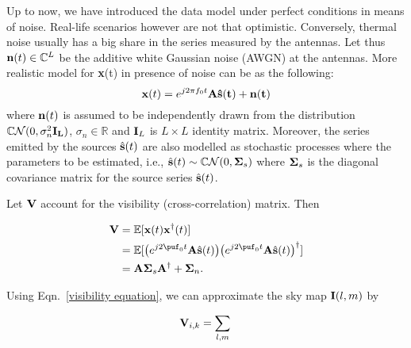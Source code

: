 \documentclass[11pt]{article}
\begin{document}
 Up to now, we have introduced the data model under perfect conditions in means of noise. Real-life scenarios however are not that optimistic. Conversely, thermal noise usually has a big share in the series measured by the antennas. Let thus ${\bf n}(t) \in \mathbb{C}^L$ be the additive white Gaussian noise (AWGN) at the antennas. More realistic model for {\bf x}(t) in presence of noise can be as the following:
 \begin{equation}
 {\bf x}(t) = e^{j2\pi f_0 t}\bf{A} \hat{\bf{s}}(t) + {\bf n}(t)\label{x_t}
 \end{equation}
where ${\bf n}(t)$ is assumed to be independently drawn from the distribution $\mathbb{C} \mathcal{N}(0,\sigma_n^2 \bf{I}_L)$, $\sigma_n \in \mathbb{R}$ and ${\bf I}_L$ is $L\times L$ identity matrix. Moreover, the series emitted by the sources $\hat{{\bf s}}(t)$ are also modelled as stochastic processes where the parameters to be estimated, i.e., $\hat{{\bf s}}(t) \sim \mathbb{C}\mathcal{N}(0, {\bf \Sigma}_s)$ where ${\bf \Sigma}_s$ is the diagonal covariance matrix for the source series $\hat{{\bf s}}(t)$. 

Let ${\bf V}$ account for the visibility (cross-correlation) matrix. Then

\begin{equation}
\begin{split}
{\bf V} & = \mathbb{E}[{\bf x}(t){\bf x}^{\dagger}(t)]\\
& = \mathbb{E}[\big(e^{j2\puf_0t}{\bf A}\hat{\bf s}(t)\big)\big(e^{j2\puf_0t}{\bf A}\hat{\bf s}(t)\big)^{\dagger}]\\
& ={\bf A}{\bf \Sigma}_s{\bf A}^{\dagger} + {\bf \Sigma}_n.
    \end{split}
\end{equation}

Using Eqn.~\ref{visibility equation}, we can approximate the sky map ${\bf I}(l, m)$ by

\begin{equation}
    {\bf V}_{i, k} = \sum_{l, m} {}
\end{equation}










































\end{document}
